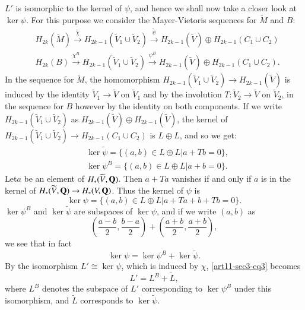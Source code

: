 $L'$ is isomorphic to the kernel of $\psi$, and hence we shall now take a closer look at $\ker \psi$. For this purpose we consider the Mayer-Vietoris sequences for $\widetilde{M}$ and $B$:
\begin{align*}
& H_{2k}(\widetilde{M})\xrightarrow{\widetilde{\chi}}H_{2k-1}(\widetilde{V}_{1}\cup \widetilde{V}_{2})\xrightarrow{\widetilde{\psi}}H_{2k-1}(\widetilde{V})\oplus H_{2k-1}(C_{1}\cup C_{2})\\[4pt]
& H_{2k}(B)\xrightarrow{\chi^{B}}H_{2k-1}(\widetilde{V}_{1}\cup \widetilde{V}_{2})\xrightarrow{\psi^{B}}H_{2k-1}(\widetilde{V})\oplus H_{2k-1}(C_{1}\cup C_{2}).
\end{align*}
In the sequence for $\widetilde{M}$, the homomorphism $H_{2k-1}(\widetilde{V}_{1}\cup \widetilde{V}_{2})\to H_{2k-1}(\widetilde{V})$ is induced by the identity $\widetilde{V}_{1}\to \widetilde{V}$ on $\widetilde{V}_{1}$ and by the involution $T:\widetilde{V}_{2}\to \widetilde{V}$ on $\widetilde{V}_{2}$, in the sequence for $B$ however by the identity on both components. If we write $H_{2k-1}(\widetilde{V}_{1}\cup \widetilde{V}_{2})$ as $H_{2k-1}(\widetilde{V})\oplus H_{2k-1}(\widetilde{V})$, the kernel of $H_{2k-1}(\widetilde{V}_{1}\cup \widetilde{V}_{2})\to H_{2k-1}(C_{1}\cup C_{2})$ is $L\oplus L$, and so we get:
\begin{align*}
&\ker \widetilde{\psi}=\{(a,b)\in L\oplus L | a+Tb=0\},\\
&\ker \psi^{B}=\{(a,b)\in L\oplus L | a+b=0\}.
\end{align*}
Let\pageoriginale $a$ be an element of $H_{*}(\widetilde{V},\mathbf{Q})$. Then $a+Ta$ vanishes if and only if $a$ is in the kernel of $H_{*}(\widetilde{V},\mathbf{Q})\to H_{*}(V,\mathbf{Q})$. Thus the kernel of $\psi$ is
$$
\ker \psi=\{(a,b)\in L\oplus L |a+Ta+b+Tb=0\}.
$$
$\ker \psi^{B}$ and $\ker \widetilde{\psi}$ are subspaces of $\ker \psi$, and if we write $(a,b)$ as 
$$
\left(\dfrac{a-b}{2},\dfrac{b-a}{2}\right)+\left(\dfrac{a+b}{2},\dfrac{a+b}{2}\right),
$$ 
we see that in fact
\begin{equation}
\ker \psi = \ker \psi^{B}+\ker \widetilde{\psi}.\label{art11-sec3-eq3}
\end{equation}
By the isomorphism $L'\cong \ker \psi$, which is induced by $\chi$, \eqref{art11-sec3-eq3} becomes
$$
L'=L^{B}+\widetilde{L},
$$
where $L^{B}$ denotes the subspace of $L'$ corresponding to $\ker \psi^{B}$ under this isomorphism, and $\widetilde{L}$ corresponds to $\ker \widetilde{\psi}$.


